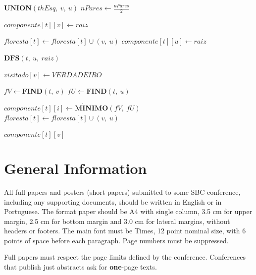 \documentclass[12pt]{article}
\begin{document}
\begin{algorithm}
{{{                
                {
                    $\textbf{UNION}(thEsq,\ v,\ u)$\;
                }
            }
            $nPares \gets \frac{nPares}{2}$\;
        }
    }
    {
        $componente[t][v] \gets raiz$\;
        
        {
            $floresta[t] \gets floresta[t] \cup (v,\ u)$\;
            $componente[t][u] \gets raiz$\;
            
            {
                {
                    $\textbf{DFS}(t,\ u,\ raiz)$\;
                }
            }
        }
        $visitado[v] \gets VERDADEIRO$\;
    }
    {
        $fV \gets  \textbf{FIND}(t,\ v)$\;
        $fU \gets  \textbf{FIND}(t,\ u)$\;
        
        {
            {
                {
                    $componente[t][i] \gets \textbf{M} \acute{\textbf{I}} \textbf{NIMO}(fV,\ fU)$\;
                }
            }
            $floresta[t] \gets floresta[t] \cup (v,\ u)$\;
        }
    }
    {
        \Return $componente[t][v]$\;
    }
\end{algorithm}

\section{General Information}

All full papers and posters (short papers) submitted to some SBC conference,
including any supporting documents, should be written in English or in
Portuguese. The format paper should be A4 with single column, 3.5 cm for upper
margin, 2.5 cm for bottom margin and 3.0 cm for lateral margins, without
headers or footers. The main font must be Times, 12 point nominal size, with 6
points of space before each paragraph. Page numbers must be suppressed.

Full papers must respect the page limits defined by the conference.
Conferences that publish just abstracts ask for \textbf{one}-page texts.
\end{document}
